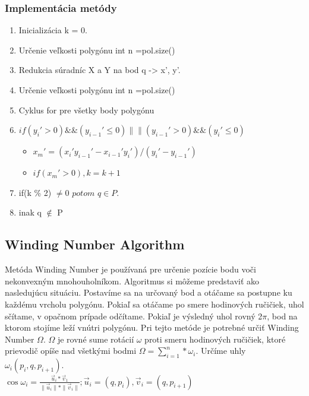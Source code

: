 \documentclass[12pt]{article}
\begin{document}
\subsubsection {Implementácia metódy}
\begin{enumerate}
\item Inicializácia k = 0.
\item Určenie veľkosti polygónu int n =pol.size()
\item Redukcia súradníc X a Y na bod q -> x', y'.
\item Určenie veľkosti polygónu int n =pol.size()
\item Cyklus for pre všetky body polygónu
\item $if(y_i' >0) \&\& (y_{i-1}' \leq 0) \|\| (y_{i-1}' > 0) \&\& (y_i' \leq 0)$

\begin{itemize}
\item $x_m'=(x_i'y_{i-1}'-x_{i-1}'y_i')/(y_i'-y_{i-1}')$
\item $if(x_m'>0), k = k+1$
\end{itemize}

\item if(k \% 2) $\neq 0$ $potom$ $q \in P$.
\item inak q $\notin$ P
\end{enumerate}

\subsection {Winding Number Algorithm}

Metóda Winding Number je používaná pre určenie pozície bodu voči nekonvexným mnohouholníkom. Algoritmus si môžeme predstaviť ako nasledujúcu situáciu. Postavíme sa na určovaný bod a otáčame sa postupne ku každému vrcholu polygónu. Pokiaľ sa otáčame po smere hodinových ručičiek, uhol sčítame, v opačnom prípade odčítame. Pokiaľ je výsledný uhol rovný 2$\pi$, bod na ktorom stojíme leží vnútri polygónu. Pri tejto metóde je potrebné určiť Winding Number $\Omega$. $\Omega$ je rovné sume rotácií $\omega$ proti smeru hodinových ručičiek, ktoré prievodič opíše nad všetkými bodmi $\Omega = \sum_{i=1}^{n}*\omega_i$. Určíme uhly $\omega_i(p_i,q,p_{i+1})$. \\[2pt]

$\cos \omega_i = \frac{\vec u_i *\vec v_1}{\parallel \vec u_i \parallel*\parallel \vec v_i \parallel}; \vec u_i = (q, p_i), \vec v_i = (q, p_{i+1})$ \\[2pt]
\end{document}

